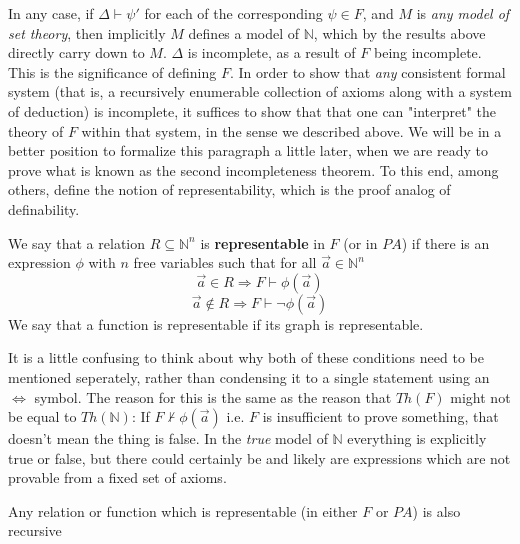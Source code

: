 \par In any case, if $\Delta \vdash \psi'$ for each of the corresponding $\psi \in F$, and $M$ is \textit{any model of set theory}, then implicitly $M$ defines a model of $\mathbb{N}$, which by the results above directly carry down to $M$. $\Delta$ is incomplete, as a result of $F$ being incomplete. This is the significance of defining $F$. In order to show that \textit{any} consistent formal system (that is, a recursively enumerable collection of axioms along with a system of deduction) is incomplete, it suffices to show that that one can "interpret" the theory of $F$ within that system, in the sense we described above. We will be in a better position to formalize this paragraph a little later, when we are ready to prove what is known as the second incompleteness theorem. To this end, among others, define the notion of representability, which is the proof analog of definability.
\begin{definition}
    We say that a relation $R \subseteq \mathbb{N}^n$ is \textbf{representable} in $F$ (or in $PA$) if there is an expression $\phi$ with $n$ free variables such that for all $\vec{a} \in \mathbb{N}^n$
    \[\vec{a} \in R \Rightarrow F \vdash \phi(\vec{a}) \]
    \[\vec{a} \notin R \Rightarrow F \vdash \neg\phi(\vec{a}) \]
    We say that a function is representable if its graph is representable.
\end{definition}
It is a little confusing to think about why both of these conditions need to be mentioned seperately, rather than condensing it to a single statement using an $\iff$ symbol. The reason for this is the same as the reason that $Th(F)$ might not be equal to $Th(\mathbb{N})$: If $F \nvdash \phi(\vec{a})$ i.e. $F$ is insufficient to prove something, that doesn't mean the thing is false. In the \textit{true} model of $\mathbb{N}$ everything is explicitly true or false, but there could certainly be and likely are expressions which are not provable from a fixed set of axioms. 
\begin{theorem}
    Any relation or function which is representable (in either $F$ or $PA$) is also recursive
\end{theorem}
